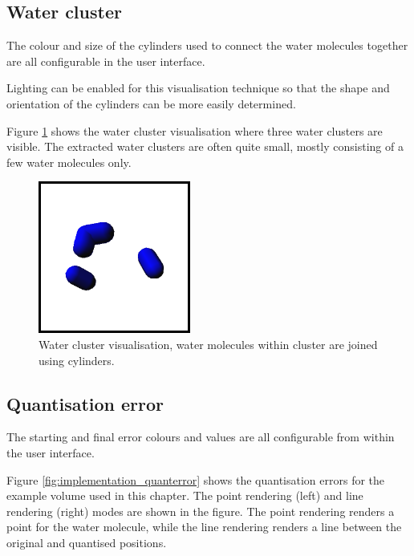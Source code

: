 

\subsection{Water cluster}
\label{sub:implementation_cluster}

The colour and size of the cylinders used to connect the water molecules
together are all configurable in the user interface.

Lighting can be enabled for this visualisation technique so that the shape and
orientation of the cylinders can be more easily determined.

Figure \ref{fig:implementation_watercluster} shows the water cluster
visualisation where three water clusters are visible. The extracted water
clusters are often quite small, mostly consisting of a few water molecules only.

\begin{figure}
  \begin{center}
    \includegraphics[width=50mm]{watercluster}
  \end{center}
  \caption{Water cluster visualisation, water molecules within cluster are
  joined using cylinders.}
  \label{fig:implementation_watercluster}
\end{figure}


\subsection{Quantisation error}
\label{sub:implementation_quantisation}

The starting and final error colours and values are all configurable from
within the user interface.

Figure \ref{fig:implementation_quanterror} shows the quantisation errors for
the example volume used in this chapter. The point rendering (left) and line
rendering (right) modes are shown in the figure. The point rendering renders a
point for the water molecule, while the line rendering renders a line between
the original and quantised positions.

